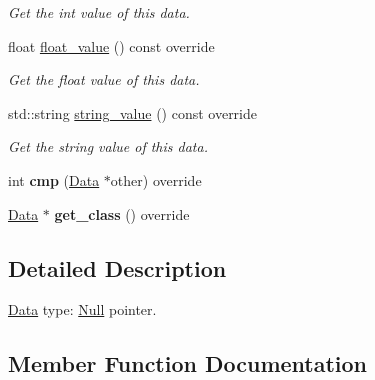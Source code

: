 \begin{DoxyCompactItemize}
\begin{DoxyCompactList}\small\item\em Get the int value of this data. \end{DoxyCompactList}\item 
float \hyperlink{classcreek_1_1_null_a563ce7b1bf40bae21cd2342d4f05e8c2}{float\+\_\+value} () const  override\hypertarget{classcreek_1_1_null_a563ce7b1bf40bae21cd2342d4f05e8c2}{}\label{classcreek_1_1_null_a563ce7b1bf40bae21cd2342d4f05e8c2}

\begin{DoxyCompactList}\small\item\em Get the float value of this data. \end{DoxyCompactList}\item 
std\+::string \hyperlink{classcreek_1_1_null_a7e71380ce1616b47125882f1b8848da5}{string\+\_\+value} () const  override\hypertarget{classcreek_1_1_null_a7e71380ce1616b47125882f1b8848da5}{}\label{classcreek_1_1_null_a7e71380ce1616b47125882f1b8848da5}

\begin{DoxyCompactList}\small\item\em Get the string value of this data. \end{DoxyCompactList}\item 
int {\bfseries cmp} (\hyperlink{classcreek_1_1_data}{Data} $\ast$other) override\hypertarget{classcreek_1_1_null_a8ed0276b8ec30965996969333fb28c75}{}\label{classcreek_1_1_null_a8ed0276b8ec30965996969333fb28c75}

\item 
\hyperlink{classcreek_1_1_data}{Data} $\ast$ {\bfseries get\+\_\+class} () override\hypertarget{classcreek_1_1_null_a2e245ab3f3f3bfb96210162def85050c}{}\label{classcreek_1_1_null_a2e245ab3f3f3bfb96210162def85050c}

\end{DoxyCompactItemize}


\subsection{Detailed Description}
\hyperlink{classcreek_1_1_data}{Data} type\+: \hyperlink{classcreek_1_1_null}{Null} pointer. 

\subsection{Member Function Documentation}
